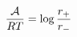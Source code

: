 \begin{equation}\label{eqn:reaction-affinity-ratio}
\frac{\mathcal A}{RT}= \log\frac{r_+}{r_-} \\
\end{equation}
